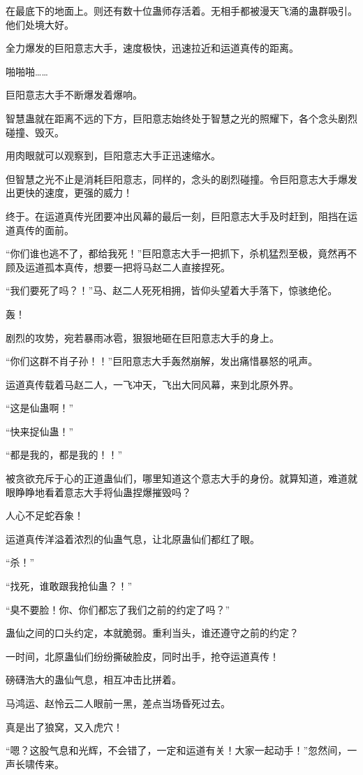 \begin{this_body}
在最底下的地面上。则还有数十位蛊师存活着。无相手都被漫天飞涌的蛊群吸引。他们处境大好。

全力爆发的巨阳意志大手，速度极快，迅速拉近和运道真传的距离。

啪啪啪……

巨阳意志大手不断爆发着爆响。

智慧蛊就在距离不远的下方，巨阳意志始终处于智慧之光的照耀下，各个念头剧烈碰撞、毁灭。

用肉眼就可以观察到，巨阳意志大手正迅速缩水。

但智慧之光不止是消耗巨阳意志，同样的，念头的剧烈碰撞。令巨阳意志大手爆发出更快的速度，更强的威力！

终于。在运道真传光团要冲出风幕的最后一刻，巨阳意志大手及时赶到，阻挡在运道真传的面前。

“你们谁也逃不了，都给我死！”巨阳意志大手一把抓下，杀机猛烈至极，竟然再不顾及运道孤本真传，想要一把将马赵二人直接捏死。

“我们要死了吗？！”马、赵二人死死相拥，皆仰头望着大手落下，惊骇绝伦。

轰！

剧烈的攻势，宛若暴雨冰雹，狠狠地砸在巨阳意志大手的身上。

“你们这群不肖子孙！！”巨阳意志大手轰然崩解，发出痛惜暴怒的吼声。

运道真传载着马赵二人，一飞冲天，飞出大同风幕，来到北原外界。

“这是仙蛊啊！”

“快来捉仙蛊！”

“都是我的，都是我的！！”

被贪欲充斥于心的正道蛊仙们，哪里知道这个意志大手的身份。就算知道，难道就眼睁睁地看着意志大手将仙蛊捏爆摧毁吗？

人心不足蛇吞象！

运道真传洋溢着浓烈的仙蛊气息，让北原蛊仙们都红了眼。

“杀！”

“找死，谁敢跟我抢仙蛊？！”

“臭不要脸！你、你们都忘了我们之前的约定了吗？”

蛊仙之间的口头约定，本就脆弱。重利当头，谁还遵守之前的约定？

一时间，北原蛊仙们纷纷撕破脸皮，同时出手，抢夺运道真传！

磅礴浩大的蛊仙气息，相互冲击比拼着。

马鸿运、赵怜云二人眼前一黑，差点当场昏死过去。

真是出了狼窝，又入虎穴！

“嗯？这股气息和光辉，不会错了，一定和运道有关！大家一起动手！”忽然间，一声长啸传来。


\end{this_body}

